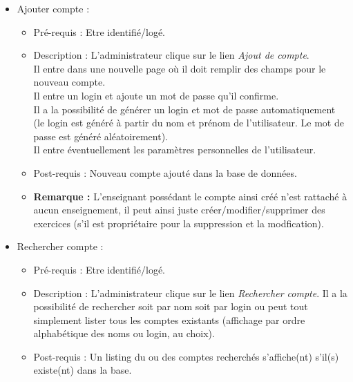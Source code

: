 \begin{itemize}
		\begin{itemize}
		\item Ajouter compte :
			\begin{itemize}
			\item Pr{\'e}-requis : Etre identifi{\'e}/log{\'e}. 
			\item Description : L'administrateur clique sur le lien {\it Ajout de compte}.\\
			Il entre dans une nouvelle page o{\`u} il doit
			remplir des champs pour le nouveau compte.\\
			Il entre un login et ajoute un mot de passe qu'il confirme.\\
			Il a la possibilit{\'e} de g{\'e}n{\'e}rer un login et
			mot de passe automatiquement (le login est g{\'e}n{\'e}r{\'e} {\`a} partir du
			nom et pr{\'e}nom de l'utilisateur. Le mot de passe est g{\'e}n{\'e}r{\'e}
			al{\'e}atoirement).\\
			Il entre {\'e}ventuellement les param{\`e}tres
			personnelles de l'utilisateur.
			\item Post-requis : Nouveau compte ajout{\'e} dans
			la base de donn{\'e}es.
			\item {\bf Remarque :} L'enseignant poss{\'e}dant
			le compte ainsi cr{\'e}{\'e} n'est rattach{\'e} {\`a} aucun
			enseignement, il peut ainsi juste
			cr{\'e}er/modifier/supprimer des exercices (s'il
			est propri{\'e}taire pour la suppression et la modfication).  
			\end{itemize}

		\item Rechercher compte :
			\begin{itemize}
			\item Pr{\'e}-requis : Etre identifi{\'e}/log{\'e}. 
			\item Description : L'administrateur clique
			sur le lien {\it Rechercher compte}. Il a la
			possibilit{\'e} de rechercher soit par nom soit
			par login ou peut tout simplement lister tous
			les comptes existants (affichage par ordre
			alphab{\'e}tique des noms ou login, au choix).
			\item Post-requis : Un listing du ou des
			comptes recherch{\'e}s s'affiche(nt) s'il(s)
			existe(nt) dans la base.
			\end{itemize}


\end{itemize}
\end{itemize}
